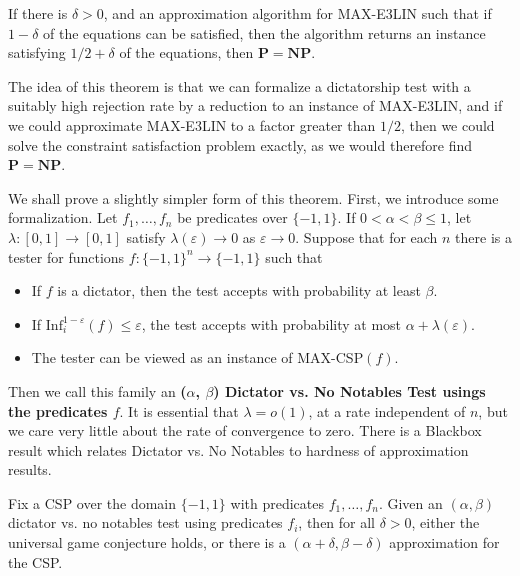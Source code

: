 \begin{theorem}[Hastad]
    If there is $\delta > 0$, and an approximation algorithm for MAX-E3LIN such that if $1 - \delta$ of the equations can be satisfied, then the algorithm returns an instance satisfying $1/2 + \delta$ of the equations, then $\mathbf{P} = \mathbf{NP}$.
\end{theorem}

The idea of this theorem is that we can formalize a dictatorship test with a suitably high rejection rate by a reduction to an instance of MAX-E3LIN, and if we could approximate MAX-E3LIN to a factor greater than $1/2$, then we could solve the constraint satisfaction problem exactly, as we would therefore find $\mathbf{P} = \mathbf{NP}$.

We shall prove a slightly simpler form of this theorem. First, we introduce some formalization. Let $f_1, \dots, f_n$ be predicates over $\{ -1, 1 \}$. If $0 < \alpha < \beta \leq 1$, let $\lambda: [0,1] \to [0,1]$ satisfy $\lambda(\varepsilon) \to 0$ as $\varepsilon \to 0$. Suppose that for each $n$ there is a tester for functions $f: \{ -1, 1 \}^n \to \{ -1, 1 \}$ such that
%
\begin{itemize}
    \item If $f$ is a dictator, then the test accepts with probability at least $\beta$.
    \item If $\text{Inf}_i^{1 - \varepsilon}(f) \leq \varepsilon$, the test accepts with probability at most $\alpha + \lambda(\varepsilon)$.
    \item The tester can be viewed as an instance of MAX-CSP$(f)$.
\end{itemize}
%
Then we call this family an {\bf ($\alpha$, $\beta$) Dictator vs. No Notables Test usings the predicates $f$}. It is essential that $\lambda = o(1)$, at a rate independent of $n$, but we care very little about the rate of convergence to zero. There is a Blackbox result which relates Dictator vs. No Notables to hardness of approximation results.

\begin{theorem}
    Fix a CSP over the domain $\{ -1, 1 \}$ with predicates $f_1, \dots, f_n$. Given an $(\alpha, \beta)$ dictator vs. no notables test using predicates $f_i$, then for all $\delta > 0$, either the universal game conjecture holds, or there is a $(\alpha + \delta, \beta - \delta)$ approximation for the CSP.
\end{theorem}

